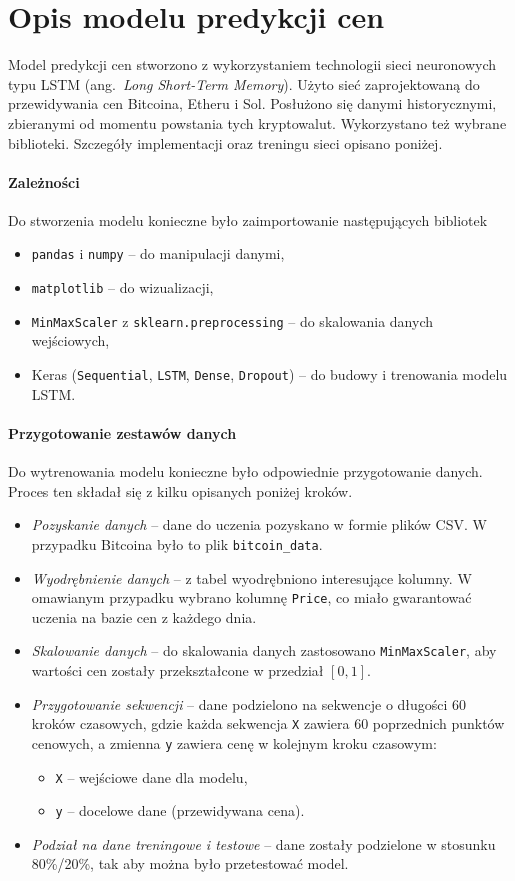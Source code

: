 \section{Opis modelu predykcji cen}
Model predykcji cen stworzono z wykorzystaniem technologii sieci neuronowych typu LSTM (ang.~\emph{Long Short-Term Memory}). Użyto sieć zaprojektowaną do przewidywania cen Bitcoina, Etheru i Sol. Posłużono się danymi historycznymi, zbieranymi od momentu powstania tych kryptowalut. Wykorzystano też wybrane biblioteki. Szczegóły implementacji oraz treningu sieci opisano poniżej.

\paragraph{Zależności}
Do stworzenia modelu konieczne było zaimportowanie następujących bibliotek
\begin{itemize}
    \item \texttt{pandas} i \texttt{numpy} -- do manipulacji danymi,
    \item \texttt{matplotlib} -- do wizualizacji,
    \item \texttt{MinMaxScaler} z \texttt{sklearn.preprocessing} -- do skalowania danych wejściowych,
    \item Keras (\texttt{Sequential}, \texttt{LSTM}, \texttt{Dense}, \texttt{Dropout}) -- do budowy i trenowania modelu LSTM.
\end{itemize}

\paragraph{Przygotowanie zestawów danych}
Do wytrenowania modelu konieczne było odpowiednie przygotowanie danych. Proces ten składał się z kilku opisanych poniżej kroków.
\begin{itemize}
\item \emph{Pozyskanie danych} -- dane do uczenia pozyskano w formie plików CSV. W przypadku Bitcoina było to plik \texttt{bitcoin\_data}.
\item \emph{Wyodrębnienie danych} -- z tabel wyodrębniono interesujące kolumny. W omawianym przypadku wybrano kolumnę \texttt{Price}, co miało gwarantować uczenia na bazie cen z każdego dnia.
\item \emph{Skalowanie danych} -- do skalowania danych zastosowano \texttt{MinMaxScaler}, aby wartości cen zostały przekształcone w przedział \([0, 1]\).
\item \emph{Przygotowanie sekwencji} -- dane podzielono na sekwencje o długości 60 kroków czasowych, gdzie każda sekwencja \texttt{X} zawiera 60 poprzednich punktów cenowych, a zmienna \texttt{y} zawiera cenę w kolejnym kroku czasowym:
\begin{itemize}
    \item \texttt{X} – wejściowe dane dla modelu,
    \item \texttt{y} – docelowe dane (przewidywana cena).
\end{itemize}
\item \emph{Podział na dane treningowe i testowe} -- dane zostały podzielone w stosunku 80\%/20\%, tak aby można było przetestować model.
\end{itemize}

